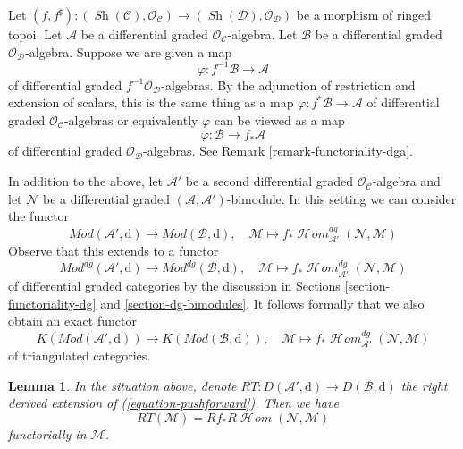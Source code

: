 \documentclass{stacks-project}
\theoremstyle{plain}
\newtheorem{lemma}[subsection]{Lemma}
\theoremstyle{definition}
\theoremstyle{remark}
\numberwithin{equation}{subsection}
\def\SheafHom{\mathop{\mathcal{H}\!\mathit{om}}\nolimits}
\def\Sh{\mathop{\mathit{Sh}}\nolimits}
\begin{document}
\medskip\noindent
Let $(f, f^\sharp) : (\Sh(\mathcal{C}), \mathcal{O}_\mathcal{C})
\to (\Sh(\mathcal{D}), \mathcal{O}_\mathcal{D})$
be a morphism of ringed topoi. Let $\mathcal{A}$ be a differential
graded $\mathcal{O}_\mathcal{C}$-algebra. Let $\mathcal{B}$ be a
differential graded $\mathcal{O}_\mathcal{D}$-algebra.
Suppose we are given a map
$$
\varphi : f^{-1}\mathcal{B} \to \mathcal{A}
$$
of differential graded $f^{-1}\mathcal{O}_\mathcal{D}$-algebras.
By the adjunction of restriction and extension of scalars, this
is the same thing as a map $\varphi : f^*\mathcal{B} \to \mathcal{A}$
of differential graded $\mathcal{O}_\mathcal{C}$-algebras or equivalently
$\varphi$ can be viewed as a map
$$
\varphi : \mathcal{B} \to f_*\mathcal{A}
$$
of differential graded $\mathcal{O}_\mathcal{D}$-algebras.
See Remark \ref{remark-functoriality-dga}.

\medskip\noindent
In addition to the above, let $\mathcal{A}'$ be a second differential
graded $\mathcal{O}_\mathcal{C}$-algebra and let $\mathcal{N}$
be a differential graded $(\mathcal{A}, \mathcal{A}')$-bimodule.
In this setting we can consider the functor
$$
\textit{Mod}(\mathcal{A}', \text{d})
\longrightarrow
\textit{Mod}(\mathcal{B}, \text{d}),\quad
\mathcal{M} \longmapsto
f_*\SheafHom^{dg}_{\mathcal{A}'}(\mathcal{N}, \mathcal{M})
$$
Observe that this extends to a functor
$$
\textit{Mod}^{dg}(\mathcal{A}', \text{d})
\longrightarrow
\textit{Mod}^{dg}(\mathcal{B}, \text{d}),\quad
\mathcal{M} \longmapsto
f_*\SheafHom^{dg}_{\mathcal{A}'}(\mathcal{N}, \mathcal{M})
$$
of differential graded categories by the discussion in
Sections \ref{section-functoriality-dg} and \ref{section-dg-bimodules}.
It follows formally that we also obtain an exact functor
\begin{equation}
\label{equation-pushforward}
K(\textit{Mod}(\mathcal{A}', \text{d}))
\longrightarrow
K(\textit{Mod}(\mathcal{B}, \text{d})),\quad
\mathcal{M} \longmapsto
f_*\SheafHom^{dg}_{\mathcal{A}'}(\mathcal{N}, \mathcal{M})
\end{equation}
of triangulated categories.

\begin{lemma}
\label{lemma-compose-pushforward-hom}
In the situation above, denote $RT : D(\mathcal{A}', \text{d}) \to
D(\mathcal{B}, \text{d})$ the right derived extension of
(\ref{equation-pushforward}). Then we have
$$
RT(\mathcal{M}) = Rf_* R\SheafHom(\mathcal{N}, \mathcal{M})
$$
functorially in $\mathcal{M}$.
\end{lemma}
\end{document}
